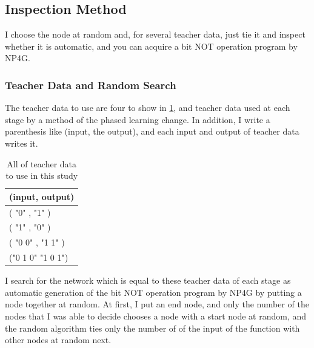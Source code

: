 \documentclass{article}
\begin{document}
\subsection {Inspection Method}
I choose the node at random and, for several teacher data, just tie it and inspect whether it is automatic, and you can acquire a bit NOT operation program by NP4G.
\subsubsection {Teacher Data and Random Search}
The teacher data to use are four to show in \ref{tbl:TeacherData}, and teacher data used at each stage by a method of the phased learning change.
In addition, I write a parenthesis like (input, the output), and each input and output of teacher data writes it.
\begin{table}[htbp]
\centering
\caption {All of teacher data to use in this study}
\label{tbl:TeacherData}
\begin{tabular}{l}
\hline
(input, output) \\
\hline \hline
( "0" , "1" ) \\
( "1" , "0" ) \\
( "0 0" , "1 1" ) \\
("0 1 0" "1 0 1") \\
\hline
\end{tabular}
\end{table}
I search for the network which is equal to these teacher data of each stage as automatic generation of the bit NOT operation program by NP4G by putting a node together at random.
At first, I put an end node, and only the number of the nodes that I was able to decide chooses a node with a start node at random, and the random algorithm ties only the number of of the input of the function with other nodes at random next.
\end{document}
